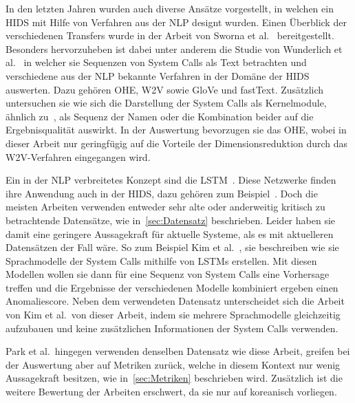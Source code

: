         In den letzten Jahren wurden auch diverse Ansätze vorgestellt, in welchen ein \ac{HIDS} mit Hilfe von Verfahren aus der \ac{NLP} designt wurden.
        Einen Überblick der verschiedenen Transfers wurde in der Arbeit von Sworna et al.~\cite{NLPHIDSSWORNA2022} bereitgestellt.
        Besonders hervorzuheben ist dabei unter anderem die Studie von Wunderlich et al.~\cite{W2VWUNDERLICH2019} in welcher sie Sequenzen von System Calls als Text betrachten und verschiedene aus der \ac{NLP} bekannte Verfahren in der Domäne der \ac{HIDS} auswerten.
        Dazu gehören \ac{OHE}, \ac{W2V} sowie GloVe und fastText. 
        Zusätzlich untersuchen sie wie sich die Darstellung der System Calls als Kernelmodule, ähnlich zu~\cite{SYSTEM_STATES}, als Sequenz der Namen oder die Kombination beider auf die Ergebnisqualität auswirkt.
        In der Auswertung bevorzugen sie das \ac{OHE}, wobei in dieser Arbeit nur geringfügig auf die Vorteile der Dimensionsreduktion durch das \ac{W2V}-Verfahren eingegangen wird.

        Ein in der \ac{NLP} verbreitetes Konzept sind die \ac{LSTM}~\cite{LSTMNLP2016,LSTMREVIEWYU2019}.
        Diese Netzwerke finden ihre Anwendung auch in der \ac{HIDS}, dazu gehören zum Beispiel~\cite{LSTMsys, LSTMPARK2021, LSTMSURATKAR2019, NIU2020, BIDIRECTIONALLSTMCHAWLA2019, VARIATIONALLSTMBOUZAR2019}.
        Doch die meisten Arbeiten verwenden entweder sehr alte oder anderweitig kritisch zu betrachtende Datensätze, wie in~\autoref{sec:Datensatz} beschrieben.
        Leider haben sie damit eine geringere Aussagekraft für aktuelle Systeme, als es mit aktuelleren Datensätzen der Fall wäre.
        So zum Beispiel Kim et al.~\cite{LSTMsys}, sie beschreiben wie sie Sprachmodelle der System Calls mithilfe von \acp{LSTM} erstellen.
        Mit diesen Modellen wollen sie dann für eine Sequenz von System Calls eine Vorhersage treffen und die Ergebnisse der verschiedenen Modelle kombiniert ergeben einen Anomaliescore.
        Neben dem verwendeten Datensatz unterscheidet sich die Arbeit von Kim et al.\ von dieser Arbeit, indem sie mehrere Sprachmodelle gleichzeitig aufzubauen und keine zusätzlichen Informationen der System Calls verwenden.

        Park et al.\ hingegen verwenden denselben Datensatz wie diese Arbeit, greifen bei der Auswertung aber auf Metriken zurück, welche in diesem Kontext nur wenig Aussagekraft besitzen, wie in~\autoref{sec:Metriken} beschrieben wird.
        Zusätzlich ist die weitere Bewertung der Arbeiten erschwert, da sie nur auf koreanisch vorliegen.~\cite{PARK2021}

